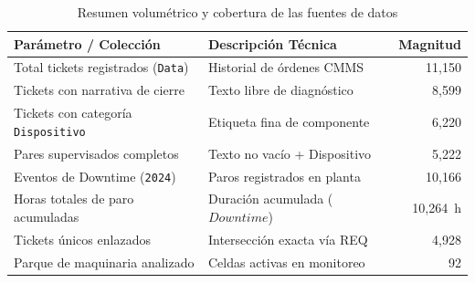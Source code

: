 \documentclass[conference]{IEEEtran}
\begin{document}
\begin{table}[htbp]
\caption{Resumen volumétrico y cobertura de las fuentes de datos}
\label{tab:dataset_summary}
\begin{center}
\begin{tabularx}{\columnwidth}{lXr}
\toprule
\textbf{Parámetro / Colección} & \textbf{Descripción Técnica} & \textbf{Magnitud} \\
\midrule
Total tickets registrados (\texttt{Data}) & Historial de órdenes CMMS & 11,150 \\
Tickets con narrativa de cierre & Texto libre de diagnóstico & 8,599 \\
Tickets con categoría \texttt{Dispositivo} & Etiqueta fina de componente & 6,220 \\
Pares supervisados completos & Texto no vacío + Dispositivo & 5,222 \\
Eventos de Downtime (\texttt{2024}) & Paros registrados en planta & 10,166 \\
Horas totales de paro acumuladas & Duración acumulada ($Downtime$) & 10,264~h \\
Tickets únicos enlazados & Intersección exacta vía REQ & 4,928 \\
Parque de maquinaria analizado & Celdas activas en monitoreo & 92 \\
\bottomrule
\end{tabularx}
\end{center}
\end{table}
\end{document}
